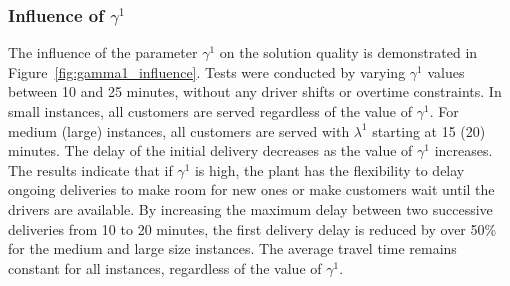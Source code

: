 \documentclass{article}
\begin{document}

\subsubsection{Influence of $\gamma^1$}

The influence of the parameter $\gamma^1$ on the solution quality is demonstrated in Figure~\ref*{fig:gamma1_influence}. Tests were conducted by varying $\gamma^1$ values between 10 and 25 minutes, without any driver shifts or overtime constraints. In small instances, all customers are served regardless of the value of $\gamma^1$. For medium (large) instances, all customers are served with $\lambda^1$ starting at 15 (20) minutes. The delay of the initial delivery decreases as the value of $\gamma^1$ increases. The results indicate that if $\gamma^1$ is high, the plant has the flexibility to delay ongoing deliveries to make room for new ones or make customers wait until the drivers are available. By increasing the maximum delay between two successive deliveries from 10 to 20 minutes, the first delivery delay is reduced by over 50\% for the medium and large size instances. The average travel time remains constant for all instances, regardless of the value of $\gamma^1$.
\end{document}

